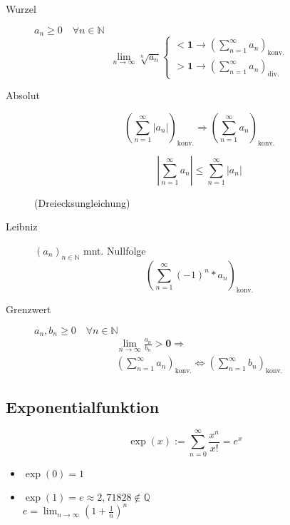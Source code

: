 \begin{mzImportant}
\begin{description}
    \item [Wurzel]
          $a_n \geq 0 \quad \forall n \in \mathbb{N}$
          $$
            \lim_{n \rightarrow \infty} \sqrt[n]{a_n} \begin{cases}
              \mathbf{< 1} \rightarrow (\sum_{n = 1}^\infty a_n)_\text{konv.} \\
              \mathbf{> 1} \rightarrow (\sum_{n = 1}^\infty a_n)_\text{div.}
            \end{cases}
          $$

    \item [Absolut]
          $$(\sum_{n=1}^\infty | a_n |)_\text{konv.} \Rightarrow (\sum_{n=1}^\infty a_n)_\text{konv.}$$

          $$| \sum_{n=1}^\infty a_n | \leq \sum_{n=1}^\infty | a_n |$$

          (Dreiecksungleichung)

    \item [Leibniz] $(a_n)_{n \in \mathbb{N}}$ mnt. Nullfolge
          $$(\sum_{n=1}^\infty (-1)^n * a_n)_\text{konv.}$$

    \item [Grenzwert] $a_n, b_n \geq 0 \quad \forall n \in \mathbb{N}$
          \begin{gather*}
            \lim_{n \rightarrow \infty} \frac{a_n}{b_n} \mathbf{> 0} \Rightarrow \\
            (\sum_{n=1}^\infty a_n)_\text{konv.} \Leftrightarrow (\sum_{n=1}^\infty b_n)_\text{konv.}
          \end{gather*}
  \end{description}
\end{mzImportant}


\subsection{Exponentialfunktion}

\begin{mzImportant}
  $$\exp(x) := \sum_{n = 0}^\infty \frac{x^n}{x!} = e^x$$
\end{mzImportant}

\begin{itemize}
  \item $\exp(0) = 1$
  \item
        $\exp(1) = e \approx 2,71828 \notin \mathbb{Q}$ \\
        $e = \lim_{n \rightarrow \infty} (1 + \frac{1}{n})^n$
\end{itemize}

